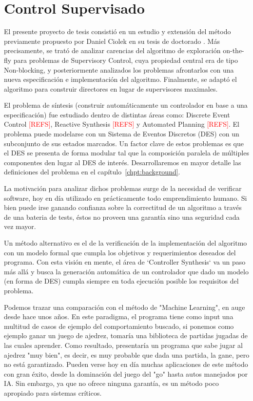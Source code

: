 \section{Control Supervisado}
El presente proyecto de tesis consistió en un estudio y extensión del método previamente propuesto por Daniel Ciolek en su tesis de doctorado \cite{tesisDani}. Más precisamente, se trató de analizar carencias del algoritmo de exploración on-the-fly para problemas de Supervisory Control, cuya propiedad central era de tipo Non-blocking, y posteriormente analizados los problemas afrontarlos con una nueva especificación e implementación del algoritmo. Finalmente, se adaptó el algoritmo para construir directores en lugar de supervisores maximales.

El problema de síntesis (construir automáticamente un controlador en base a una especificación) fue estudiado dentro de distintas áreas como: Discrete Event Control \textcolor{red}{[REFS]}, Reactive Synthesis \textcolor{red}{[REFS]} y Automated Planning \textcolor{red}{[REFS]}. El problema puede modelarse con un Sistema de Eventos Discretos (DES) con un subconjunto de sus estados marcados. Un factor clave de estos problemas es que el DES se presenta de forma modular tal que la composición paralela de múltiples componentes den lugar al DES de interés. Desarrollaremos en mayor detalle las definiciones del problema en el capítulo~\ref{chpt:background}.

La motivación para analizar dichos problemas surge de la necesidad de verificar software, hoy en día utilizado en prácticamente todo emprendimiento humano. Si bien puede irse ganando confianza sobre la correctitud de un algoritmo a través de una bateria de tests, éstos no proveen una garantía sino una seguridad cada vez mayor. 

Un método alternativo es el de la verificación de la implementación del algoritmo con un modelo formal que cumpla los objetivos y requerimientos deseados del programa. Con esta visión en mente, el área de `Controller Synthesis` va un paso más allá y busca la generación automática de un controlador que dado un modelo (en forma de DES) cumpla siempre en toda ejecución posible los requisitos del problema.

Podemos trazar una comparación con el método de "Machine Learning", en auge desde hace unos años. En este paradigma, el programa tiene como input una multitud de casos de ejemplo del comportamiento buscado, si ponemos como ejemplo ganar un juego de ajedrez, tomaría una biblioteca de partidas jugadas de las cuales aprender. Como resultado, presentaría un programa que sabe jugar al ajedrez "muy bien", es decir, es muy probable que dada una partida, la gane, pero no está garantizado. Pueden verse hoy en día muchas aplicaciones de este método con gran éxito, desde la dominación del juego del "go" hasta autos manejados por IA. Sin embargo, ya que no ofrece ninguna garantía, es un método poco apropiado para sistemas críticos.


